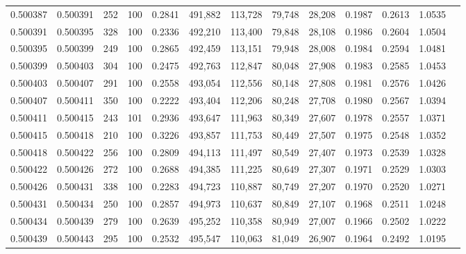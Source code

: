\begin{tabular}{rrrrrrrrrrrrr}
0.500387 & 0.500391 &   252 & 100 &                                     0.2841 & 491,882 & 113,728 &  79,748 &  28,208 & 0.1987 & 0.2613 & 1.0535 \\
0.500391 & 0.500395 &   328 & 100 &                                     0.2336 & 492,210 & 113,400 &  79,848 &  28,108 & 0.1986 & 0.2604 & 1.0504 \\
0.500395 & 0.500399 &   249 & 100 &                                     0.2865 & 492,459 & 113,151 &  79,948 &  28,008 & 0.1984 & 0.2594 & 1.0481 \\
0.500399 & 0.500403 &   304 & 100 &                                     0.2475 & 492,763 & 112,847 &  80,048 &  27,908 & 0.1983 & 0.2585 & 1.0453 \\
0.500403 & 0.500407 &   291 & 100 &                                     0.2558 & 493,054 & 112,556 &  80,148 &  27,808 & 0.1981 & 0.2576 & 1.0426 \\
0.500407 & 0.500411 &   350 & 100 &                                     0.2222 & 493,404 & 112,206 &  80,248 &  27,708 & 0.1980 & 0.2567 & 1.0394 \\
0.500411 & 0.500415 &   243 & 101 &                                     0.2936 & 493,647 & 111,963 &  80,349 &  27,607 & 0.1978 & 0.2557 & 1.0371 \\
0.500415 & 0.500418 &   210 & 100 &                                     0.3226 & 493,857 & 111,753 &  80,449 &  27,507 & 0.1975 & 0.2548 & 1.0352 \\
0.500418 & 0.500422 &   256 & 100 &                                     0.2809 & 494,113 & 111,497 &  80,549 &  27,407 & 0.1973 & 0.2539 & 1.0328 \\
0.500422 & 0.500426 &   272 & 100 &                                     0.2688 & 494,385 & 111,225 &  80,649 &  27,307 & 0.1971 & 0.2529 & 1.0303 \\
0.500426 & 0.500431 &   338 & 100 &                                     0.2283 & 494,723 & 110,887 &  80,749 &  27,207 & 0.1970 & 0.2520 & 1.0271 \\
0.500431 & 0.500434 &   250 & 100 &                                     0.2857 & 494,973 & 110,637 &  80,849 &  27,107 & 0.1968 & 0.2511 & 1.0248 \\
0.500434 & 0.500439 &   279 & 100 &                                     0.2639 & 495,252 & 110,358 &  80,949 &  27,007 & 0.1966 & 0.2502 & 1.0222 \\
0.500439 & 0.500443 &   295 & 100 &                                     0.2532 & 495,547 & 110,063 &  81,049 &  26,907 & 0.1964 & 0.2492 & 1.0195 \\

\end{tabular}
